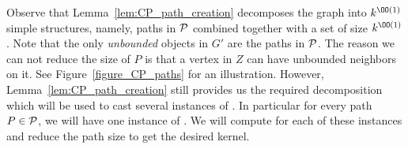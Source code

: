  
Observe that Lemma~\ref{lem:CP_path_creation} decomposes the graph into $k^{\OO(1)}$ simple structures, namely, paths in $\cal P$  combined together with a set of size $k^{\OO(1)}$. Note that the only {\em unbounded} objects in $G'$ are the paths in $\cal P$. The reason we can not reduce the size of $P$ is that a vertex in $Z$ can have unbounded neighbors on it. See Figure~\ref{figure_CP_paths} for an illustration. However,  
Lemma~\ref{lem:CP_path_creation} still  provides us the required decomposition which will be used to cast several instances of 
\shortULI{$\epsilon$}. In particular for every path $P \in \cal P$, we will have one instance of 
\shortULI{$\epsilon$}. We will compute \shortuli{$\epsilon$} for each of these instances and reduce the path size to get the desired kernel. 





